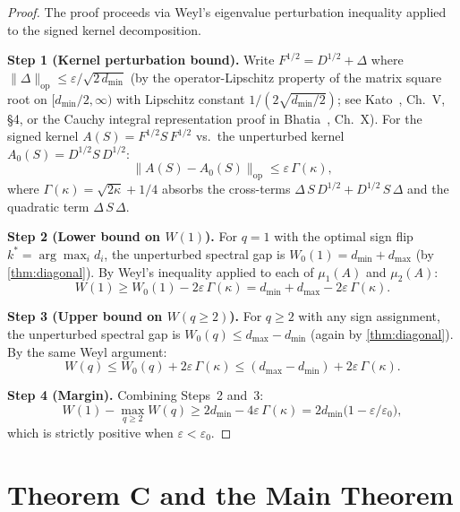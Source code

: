 \documentclass[11pt]{article}
\theoremstyle{definition}
\theoremstyle{remark}
\begin{document}
\begin{proof}
The proof proceeds via Weyl's eigenvalue perturbation inequality applied
to the signed kernel decomposition.

\medskip\noindent
\textbf{Step 1 (Kernel perturbation bound).}
Write $F^{1/2} = D^{1/2} + \Delta$ where
$\|\Delta\|_{\mathrm{op}} \leq \varepsilon/\sqrt{2\,d_{\min}}$
(by the operator-Lipschitz property of the matrix square root on
$[d_{\min}/2, \infty)$ with Lipschitz constant $1/(2\sqrt{d_{\min}/2})$;
see Kato~\cite{Kato1995}, Ch.~V, \S4, or the Cauchy integral
representation proof in Bhatia~\cite{Bhatia1997}, Ch.~X).
For the signed kernel $A(S) = F^{1/2} S\,F^{1/2}$ vs.\
the unperturbed kernel $A_0(S) = D^{1/2} S\,D^{1/2}$:
\[
  \|A(S) - A_0(S)\|_{\mathrm{op}} \leq \varepsilon\,\Gamma(\kappa),
\]
where $\Gamma(\kappa) = \sqrt{2\kappa} + 1/4$ absorbs the cross-terms
$\Delta\,S\,D^{1/2} + D^{1/2}\,S\,\Delta$ and the quadratic
term $\Delta\,S\,\Delta$.

\medskip\noindent
\textbf{Step 2 (Lower bound on $W(1)$).}
For $q = 1$ with the optimal sign flip $k^* = \arg\max_i d_i$,
the unperturbed spectral gap is $W_0(1) = d_{\min} + d_{\max}$
(by \cref{thm:diagonal}).
By Weyl's inequality applied to each of $\mu_1(A)$ and $\mu_2(A)$:
\[
  W(1) \geq W_0(1) - 2\varepsilon\,\Gamma(\kappa)
  = d_{\min} + d_{\max} - 2\varepsilon\,\Gamma(\kappa).
\]

\medskip\noindent
\textbf{Step 3 (Upper bound on $W(q \geq 2)$).}
For $q \geq 2$ with any sign assignment, the unperturbed spectral gap is
$W_0(q) \leq d_{\max} - d_{\min}$ (again by \cref{thm:diagonal}).
By the same Weyl argument:
\[
  W(q) \leq W_0(q) + 2\varepsilon\,\Gamma(\kappa)
  \leq (d_{\max} - d_{\min}) + 2\varepsilon\,\Gamma(\kappa).
\]

\medskip\noindent
\textbf{Step 4 (Margin).}
Combining Steps~2 and~3:
\[
  W(1) - \max_{q \geq 2} W(q)
  \geq 2d_{\min} - 4\varepsilon\,\Gamma(\kappa)
  = 2d_{\min}\bigl(1 - \varepsilon/\varepsilon_0\bigr),
\]
which is strictly positive when $\varepsilon < \varepsilon_0$.
\end{proof}


\section{Theorem C and the Main Theorem}
\label{sec:theorem-C}
\end{document}
